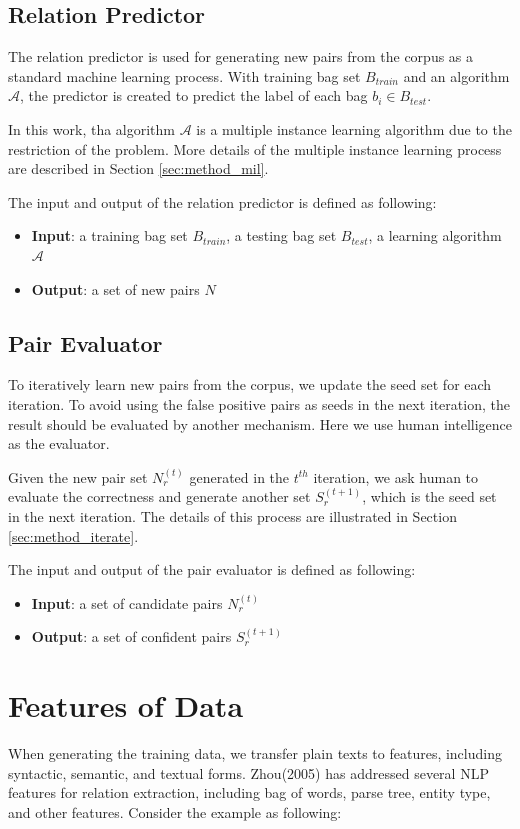\subsection{Relation Predictor}
\label{method:RP}
The relation predictor is used for generating new pairs from the corpus as a standard machine learning process.
With training bag set $B_{train}$ and an algorithm $\mathcal{A}$, the predictor is created to predict the label of each bag $b_i\in B_{test}$.
\par
In this work, tha algorithm $\mathcal{A}$ is a multiple instance learning algorithm due to the restriction of the problem.
More details of the multiple instance learning process are described in Section \ref{sec:method_mil}.
\par
The input and output of the relation predictor is defined as following:
\begin{itemize}
\item \textbf{Input}: a training bag set $B_{train}$, a testing bag set $B_{test}$, a learning algorithm $\mathcal{A}$
\item \textbf{Output}: a set of new pairs $N$
\end{itemize}

\subsection{Pair Evaluator}
To iteratively learn new pairs from the corpus, we update the seed set for each iteration.
To avoid using the false positive pairs as seeds in the next iteration, the result should be evaluated by another mechanism.
Here we use human intelligence as the evaluator.
\par
Given the new pair set $N^{(t)}_r$ generated in the $t^{th}$ iteration, we ask human to evaluate the correctness and generate another set $S^{(t+1)}_r$, which is the seed set in the next iteration.
The details of this process are illustrated in Section \ref{sec:method_iterate}.
\par
The input and output of the pair evaluator is defined as following:
\begin{itemize}
\item \textbf{Input}: a set of candidate pairs $N^{(t)}_r$
\item \textbf{Output}: a set of confident pairs $S^{(t+1)}_r$
\end{itemize}


\section{Features of Data}
\label{sec:method_feature}
When generating the training data, we transfer plain texts to features, including syntactic, semantic, and textual forms. 
Zhou(2005)\cite{guodong2005exploring} has addressed several NLP features for relation extraction, including bag of words, parse tree, entity type, and other features.
Consider the example as following:

